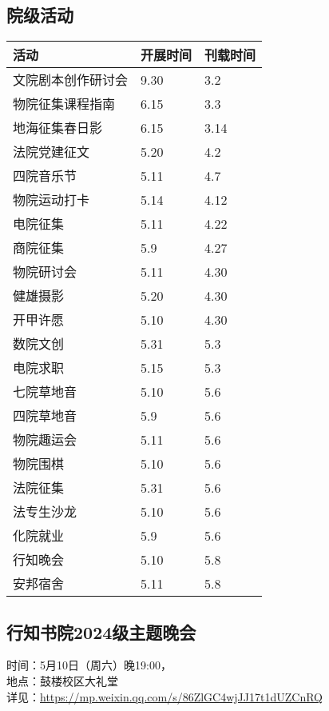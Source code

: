 \documentclass[letterpaper, 12pt]{article}
\begin{document}
\begin{multicols}{2}
\section{院级活动}
\begin{tabular}{|>{\centering\arraybackslash}m{}|m{}|m{}|}
\hline
    活动 & 开展时间 & 刊载时间\\
    \hline\hline
    文院剧本创作研讨会 & 9.30 & 3.2\\
    物院征集课程指南 & 6.15 & 3.3\\
    地海征集春日影 & 6.15 & 3.14\\
    法院党建征文 & 5.20 & 4.2\\
    四院音乐节 & 5.11 & 4.7\\
    物院运动打卡 & 5.14 & 4.12\\
    电院征集 & 5.11 & 4.22\\
    商院征集 & 5.9 & 4.27\\
    物院研讨会 & 5.11 & 4.30\\
    健雄摄影 & 5.20 & 4.30\\
    开甲许愿 & 5.10 & 4.30\\
    数院文创 & 5.31 & 5.3\\
    电院求职 & 5.15 & 5.3\\
    七院草地音 & 5.10 & 5.6\\
    四院草地音 & 5.9 & 5.6\\
    物院趣运会 & 5.11 & 5.6\\
    物院围棋 & 5.10 & 5.6\\
    法院征集 & 5.31 & 5.6\\
    法专生沙龙 & 5.10 & 5.6\\
    化院就业 & 5.9 & 5.6\\
    行知晚会 & 5.10 & 5.8\\
    安邦宿舍 & 5.11 & 5.8\\
    \hline
\end{tabular}
\subsection{ 行知书院2024级主题晚会} %
时间：5月10日（周六）晚19:00，
\\地点：鼓楼校区大礼堂
\\详见：\url{https://mp.weixin.qq.com/s/86ZlGC4wjJJ17t1dUZCnRQ}


\end{multicols}
\end{document}
